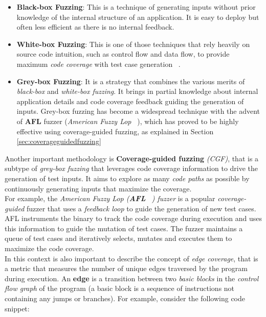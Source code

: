 \begin{itemize}
    \item \textbf{Black-box Fuzzing}: This is a technique of generating inputs without prior knowledge of the internal structure of an application. It is easy to deploy but often less efficient as there is no internal feedback.
    
    \item \textbf{White-box Fuzzing}: This is one of those techniques that rely heavily on source code intuition, such as control flow and data flow, to provide maximum \textit{code coverage} with test case generation ~\cite{grammarfuzzingwhitebox}.
    
    \item \textbf{Grey-box Fuzzing}: It is a strategy that combines the various merits of \textit{black-box} and \textit{white-box fuzzing}. It brings in partial knowledge about internal application details and code coverage feedback guiding the generation of inputs. Grey-box fuzzing has become a widespread technique with the advent of \textbf{AFL} fuzzer (\textit{American Fuzzy Lop} ~\cite{afl}), which has proved to be highly effective using coverage-guided fuzzing, as explained in Section \ref{sec:coverageguidedfuzzing}
\end{itemize}
Another important methodology is \textbf{Coverage-guided fuzzing} \textit{(CGF)}, that is a subtype of \textit{grey-box fuzzing} that leverages code coverage information to drive the generation of test inputs. It aims to explore as many \textit{code paths} as possible by continuously generating inputs that maximize the coverage.
\\For example, the \textit{American Fuzzy Lop (\textbf{AFL} ~\cite{afl}) fuzzer} is a popular \textit{coverage-guided} fuzzer that uses a \textit{feedback loop} to guide the generation of new test cases. AFL instruments the binary to track the code coverage during execution and uses this information to guide the mutation of test cases. The fuzzer maintains a queue of test cases and iteratively selects, mutates and executes them to maximize the code coverage.
\\In this context is also important to describe the concept of \textit{edge coverage}, that is a metric that measures the number of unique edges traversed by the program during execution. An \textbf{edge} is a transition between two \textit{basic blocks} in the \textit{control flow graph} of the program (a basic block is a sequence of instructions not containing any jumps or branches).
For example, consider the following code snippet:

